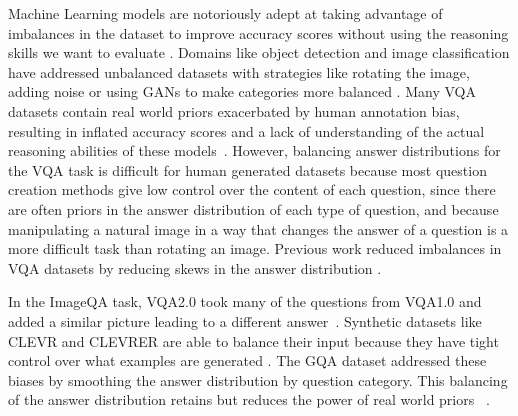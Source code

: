 Machine Learning models are notoriously adept at taking advantage of imbalances in the dataset to improve accuracy scores without using the reasoning skills we want to evaluate \cite{hudson2019gqa, goyal2017making, johnson2017clevr, mariani2018bagan, shorten2019survey}. Domains like object detection and image classification have addressed unbalanced datasets with strategies like rotating the image, adding noise or using GANs to make categories more balanced \cite{mariani2018bagan, shorten2019survey}. Many VQA datasets contain real world priors exacerbated by human annotation bias, resulting in inflated accuracy scores and a lack of understanding of the actual reasoning abilities of these models~\cite{goyal2017making,hudson2019gqa}. However, balancing answer distributions for the VQA task is difficult for human generated datasets because most question creation methods give low control over the content of each question, since there are often priors in the answer distribution of each type of question, and because manipulating a natural image in a way that changes the answer of a question is a more difficult task than rotating an image. Previous work reduced imbalances in VQA datasets by reducing skews in the answer distribution \cite{hudson2019gqa, goyal2017making, johnson2017clevr}.

In the ImageQA task, VQA2.0 took many of the questions from VQA1.0 and added a similar picture leading to a different answer~\cite{goyal2017making}. Synthetic datasets like CLEVR and CLEVRER are able to balance their input because they have tight control over what examples are generated \cite{johnson2017clevr, yi2019clevrer}. The GQA dataset addressed these biases by smoothing the answer distribution by question category. This balancing of the answer distribution retains but reduces the power of real world priors ~\cite{hudson2019gqa}. 

